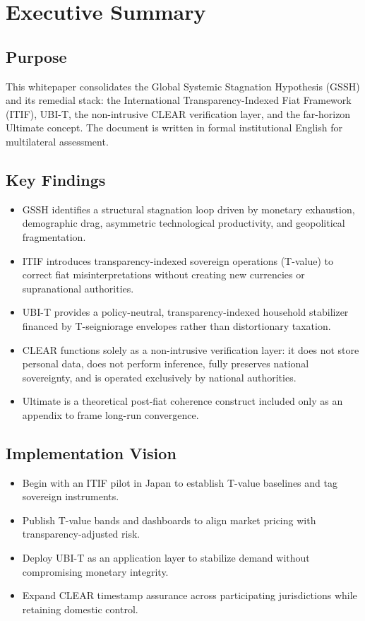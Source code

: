 \section{Executive Summary}
\subsection{Purpose}
This whitepaper consolidates the Global Systemic Stagnation Hypothesis (GSSH) and its remedial stack: the International Transparency-Indexed Fiat Framework (ITIF), UBI-T, the non-intrusive CLEAR verification layer, and the far-horizon Ultimate concept. The document is written in formal institutional English for multilateral assessment.

\subsection{Key Findings}
\begin{itemize}
  \item GSSH identifies a structural stagnation loop driven by monetary exhaustion, demographic drag, asymmetric technological productivity, and geopolitical fragmentation.
  \item ITIF introduces transparency-indexed sovereign operations (T-value) to correct fiat misinterpretations without creating new currencies or supranational authorities.
  \item UBI-T provides a policy-neutral, transparency-indexed household stabilizer financed by T-seigniorage envelopes rather than distortionary taxation.
  \item CLEAR functions solely as a non-intrusive verification layer: it does not store personal data, does not perform inference, fully preserves national sovereignty, and is operated exclusively by national authorities.
  \item Ultimate is a theoretical post-fiat coherence construct included only as an appendix to frame long-run convergence.
\end{itemize}

\subsection{Implementation Vision}
\begin{itemize}
  \item Begin with an ITIF pilot in Japan to establish T-value baselines and tag sovereign instruments.
  \item Publish T-value bands and dashboards to align market pricing with transparency-adjusted risk.
  \item Deploy UBI-T as an application layer to stabilize demand without compromising monetary integrity.
  \item Expand CLEAR timestamp assurance across participating jurisdictions while retaining domestic control.
\end{itemize}
